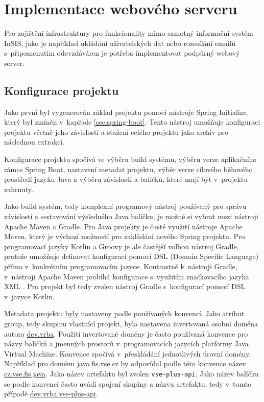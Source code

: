 \chapter{Implementace webového serveru}\label{chap:server}

Pro zajištění infrastruktury pro funkcionality mimo samotný informační systém InSIS, jako je například ukládání uživatelských dat nebo rozesílání emailů s~připomenutím odevzdáváren je potřeba implementovat podpůrný webový server. 

\section{Konfigurace projektu}

Jako první byl vygenerován základ projektu pomocí nástroje Spring Initializr, který byl zmíněn v~kapitole \ref{sec:spring-boot}. Tento nástroj umožňuje konfiguraci projektu včetně jeho závislostí a stažení celého projektu jako archiv pro následnou extrakci.

Konfigurace projektu spočívá ve výběru build systému, výběru verze aplikačního rámce Spring Boot, nastavení metadat projektu, výběr verze cílového běhového prostředí jazyku Java a výběru závislostí a balíčků, které mají být v~projektu zahrnuty.

Jako build systém, tedy komplexní programový nástroj používaný pro správu závislostí a sestavování výsledného Java balíčku, je možné si vybrat mezi nástroji Apache Maven a Gradle. Pro Java projekty je časté využití nástroje Apache Maven, který je výchozí možností pro zakládání nového Spring projektu. Pro programovací jazyky Kotlin a Groovy je ale častější volbou nástroj Gradle, protože umožňuje definovat konfiguraci pomocí DSL (Domain Specific Language) přímo v~konkrétním programovacím jazyce. Kontrastně k~nástroji Gradle, v~nástroji Apache Maven probíhá konfigurace s~využitím značkovacího jazyka XML \cite{pom_reference}. Pro projekt byl tedy zvolen nástroj Gradle s~konfigurací pomocí DSL v~jazyce Kotlin.

Metadata projektu byly nastaveny podle používaných konvencí. Jako atribut group, tedy skupinu vlastnící projekt, byla nastavena invertovaná osobní doména autora \url{dev.vrba}. Použití invertované domény je často používaná konvence pro názvy balíčků a jmenných prostorů v~programovacích jazycích platformy Java Virtual Machine. Konvence spočívá v~přeskládání jednotlivých úrovní domény. Například pro doménu \url{java.fis.vse.cz} by odpovídal podle této konvence název \url{cz.vse.fis.java}. Jako název artefaktu byl zvolen \verb|vse-plus-api|. Jako název balíčku se podle konvencí často uvádí spojení skupiny a názvu artefaktu, tedy v~tomto případě \url{dev.vrba.vse-plus-api}. 

